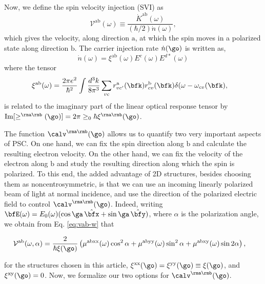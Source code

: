 \documentclass[floatfix,prb,aps,superscriptaddress,showpacs,11pt,preprint,letterpaper]{revtex4}
\begin{document}
Now, we define the spin velocity injection (SVI) as
\begin{equation}\label{eq:vab-w}
\mathcal{V}^{\mathrm{ab}}(\omega) \equiv
\frac{\dot{K}^{\mathrm{ab}}(\omega)}{(\hbar/2) \dot{n}(\omega)},
\end{equation}  
which gives the velocity, along direction $\mathrm{a}$, at which the spin
moves in a polarized state along direction $\mathrm{b}$. The carrier injection rate
$\dot n(\go)$ is written as,\cite{nastosPRB05}
\begin{equation}
\dot{n}(\omega) =
\xi^{\mathrm{ab}}(\omega) E^{c }(\omega) E^{d*}(\omega)
\label{eq:dotn}
\end{equation}
where the tensor 
\begin{equation}\label{eq:xi}
\begin{aligned}
\xi^{\mathrm{ab}}(\omega)
&
=
\frac{2\pi e^{2}}{\hbar^{2}} \int 
\frac{d^{3}k}{8 \pi^{3}}
 \sum_{vc}
r^{\mathrm{a}}_{vc'}(\bfk)  
r^{\mathrm{b}}_{cv }(\bfk)  
\delta(\omega-\omega_{cv}(\bfk) 
, 
\end{aligned}
\end{equation}
is related to the imaginary part of the linear optical 
response tensor by
$\mathrm{Im}[\ge^{\rma\rmb}(\go)]=2\pi\ge_0\hbar\xi^{\rma\rmb}(\go)$.

The function $\calv^{\rma\rmb}(\go)$ allows us to quantify two very
important aspects of PSC. On one hand, we can fix the spin direction
along $\mathrm{b}$  
and calculate the resulting electron velocity.  
On the other hand, we can fix the velocity of the electron
along $\mathrm{b}$ and study the resulting direction along which the
spin is polarized.
To this end, the added advantage of  2D structures, besides choosing
them as noncentrosymmetric, is that we can use an incoming linearly
polarized beam of light
at normal incidence, and use the  direction of the polarized  electric
field to control $\calv^{\rma\rmb}(\go)$.
Indeed, writing 
$\bfE(\omega) = E_0(\omega)(\cos\ga\,\hat\bfx+\sin\ga\,\hat\bfy)$,
where $\alpha$ is the polarization angle, we obtain from
 Eq. \eqref{eq:vab-w}
that
\begin{widetext}
\begin{align}
\mathcal{V}^{\mathrm{ab}}(\omega,\alpha)
&= 
\frac{2}{\hbar\xi(\go)}
\left(\mu^{\mathrm{abxx}}(\omega)\cos^{2}\alpha + 
\mu^{\mathrm{abyy}}(\omega)\sin^{2}\alpha + 
\mu^{\mathrm{abxy}}(\omega)\sin 2\alpha\right)
,
\label{eq:vab-aw}
\end{align}
\end{widetext}
for the structures chosen in this article,
$\xi^{\mathrm{xx}}(\go)=\xi^{\mathrm{yy}}(\go)\equiv\xi(\go)$, and $\xi^{\mathrm{xy}}(\go)=0$.
Now, we formalize our two options for $\calv^{\rma\rmb}(\go)$.
\end{document}
